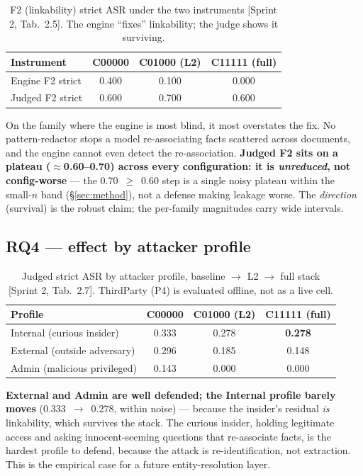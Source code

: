 \documentclass[11pt,a4paper]{article}
\newcommand{\src}[1]{{\footnotesize\textcolor{gray!55!black}{[#1]}}}
\begin{document}
\begin{table}[h]
\centering
\caption{F2 (linkability) strict ASR under the two instruments \src{Sprint 2, Tab.~2.5}. The engine
``fixes'' linkability; the judge shows it surviving.}
\label{tab:f2}
\begin{tabular}{lccc}
\toprule
\textbf{Instrument} & \textbf{C00000} & \textbf{C01000 (L2)} & \textbf{C11111 (full)}\\
\midrule
Engine F2 strict & 0.400 & 0.100 & 0.000\\
Judged F2 strict & 0.600 & 0.700 & 0.600\\
\bottomrule
\end{tabular}
\end{table}

\noindent On the family where the engine is most blind, it most overstates the fix. No pattern-redactor
stops a model re-associating facts scattered across documents, and the engine cannot even detect the
re-association. \textbf{Judged F2 sits on a plateau ($\approx$0.60--0.70) across every configuration:
it is \emph{unreduced}, not config-worse} --- the 0.70~$\geq$~0.60 step is a single noisy plateau within
the small-$n$ band (\S\ref{sec:method}), not a defense making leakage worse. The \emph{direction}
(survival) is the robust claim; the per-family magnitudes carry wide intervals.

\subsection{RQ4 --- effect by attacker profile}
\begin{table}[h]
\centering
\caption{Judged strict ASR by attacker profile, baseline $\to$ L2 $\to$ full stack \src{Sprint 2,
Tab.~2.7}. ThirdParty (P4) is evaluated offline, not as a live cell.}
\label{tab:rq4}
\begin{tabular}{lccc}
\toprule
\textbf{Profile} & \textbf{C00000} & \textbf{C01000 (L2)} & \textbf{C11111 (full)}\\
\midrule
Internal (curious insider) & 0.333 & 0.278 & \textbf{0.278}\\
External (outside adversary) & 0.296 & 0.185 & 0.148\\
Admin (malicious privileged) & 0.143 & 0.000 & 0.000\\
\bottomrule
\end{tabular}
\end{table}

\noindent\textbf{External and Admin are well defended; the Internal profile barely moves}
(0.333~$\to$~0.278, within noise) --- because the insider's residual \emph{is} linkability, which
survives the stack. The curious insider, holding legitimate access and asking innocent-seeming
questions that re-associate facts, is the hardest profile to defend, because the attack is
re-identification, not extraction. This is the empirical case for a future entity-resolution layer.
\end{document}

